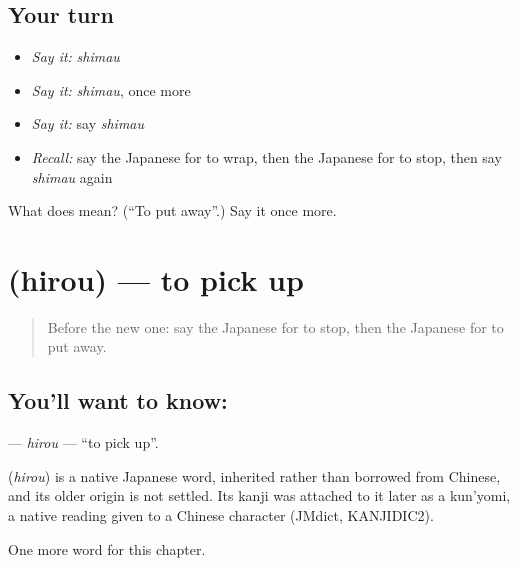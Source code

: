 \subsection*{Your turn}
\begin{itemize}
\raggedright
  \item \emph{Say it:} \emph{shimau}
  \item \emph{Say it:} \emph{shimau}, once more
  \item \emph{Say it:} say \emph{shimau}
  \item \emph{Recall:} say the Japanese for to wrap, then the Japanese for to stop, then say \emph{shimau} again
\end{itemize}

\begin{tcolorbox}[breakable,colback=teal!4,colframe=teal!35!black,title={Before you move on}]
What does  mean? (\textquotedblleft{}To put away\textquotedblright{}.) Say it once more.
\end{tcolorbox}
\section[\texorpdfstring{\ja{ひろう} (hirou)}{ひろう (hirou)}]{ (hirou) — to pick up}

\label{lesson:JA-C91-hirou}



\begin{quote}
Before the new one: say the Japanese for to stop, then the Japanese for to put away.
\end{quote}

\subsection*{You'll want to know: }
\textbf{} — \emph{hirou} — \textquotedblleft{}to pick up\textquotedblright{}.

\begin{cousinweb}
\textbf{} (\emph{hirou}) is a native Japanese word, inherited rather than borrowed from Chinese, and its older origin is not settled. Its kanji was attached to it later as a kun'yomi, a native reading given to a Chinese character (JMdict, KANJIDIC2).
\end{cousinweb}

\begin{grammarlens}[title={What you've built}]
One more word for this chapter.
\end{grammarlens}

